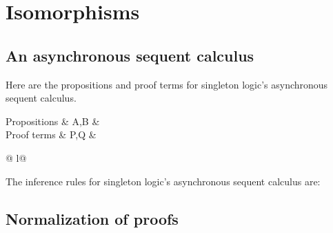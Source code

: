 \chapter{Isomorphisms}

\section{An asynchronous sequent calculus}

Here are the propositions and proof terms for singleton logic's asynchronous sequent calculus.
\begin{syntax*}
  Propositions & A,B &
    \alpha \mid {}
           \mid {}
  \\
  Proof terms & P,Q &
     \mid \fwd
      \begin{array}[t]{@{{} \mid {}}l@{}}
        \selectR{\kay} \mid {} \\
         \mid \selectL{\kay}
      \end{array}
\end{syntax*}
The inference rules for singleton logic's asynchronous sequent calculus are:



\section{Normalization of proofs}

